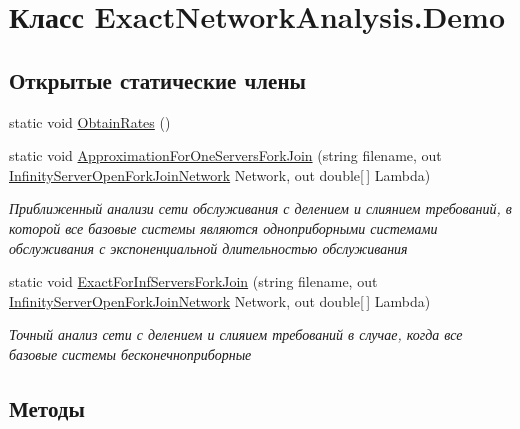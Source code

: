 \hypertarget{class_exact_network_analysis_1_1_demo}{}\section{Класс Exact\+Network\+Analysis.\+Demo}
\label{class_exact_network_analysis_1_1_demo}
\subsection*{Открытые статические члены}
\begin{DoxyCompactItemize}
\item 
static void \hyperlink{class_exact_network_analysis_1_1_demo_a8b49f90970eaee3990d0db217bc24cb6}{Obtain\+Rates} ()
\item 
static void \hyperlink{class_exact_network_analysis_1_1_demo_af1415c42cf2bcf608dad25c9846e1afa}{Approximation\+For\+One\+Servers\+Fork\+Join} (string filename, out \hyperlink{class_exact_network_analysis_1_1_infinity_server_open_fork_join_network}{Infinity\+Server\+Open\+Fork\+Join\+Network} Network, out double\mbox{[}$\,$\mbox{]} Lambda)
\begin{DoxyCompactList}\small\item\em Приближенный анализи сети обслуживания с делением и слиянием требований, в которой все базовые системы являются одноприборными системами обслуживания с экспоненциальной длительностью обслуживания \end{DoxyCompactList}\item 
static void \hyperlink{class_exact_network_analysis_1_1_demo_aef9a330a3f77b0cfcdd7ff59cf5d9e5b}{Exact\+For\+Inf\+Servers\+Fork\+Join} (string filename, out \hyperlink{class_exact_network_analysis_1_1_infinity_server_open_fork_join_network}{Infinity\+Server\+Open\+Fork\+Join\+Network} Network, out double\mbox{[}$\,$\mbox{]} Lambda)
\begin{DoxyCompactList}\small\item\em Точный анализ сети с делением и слияием требований в случае, когда все базовые системы бесконечноприборные \end{DoxyCompactList}\end{DoxyCompactItemize}


\subsection{Методы}
